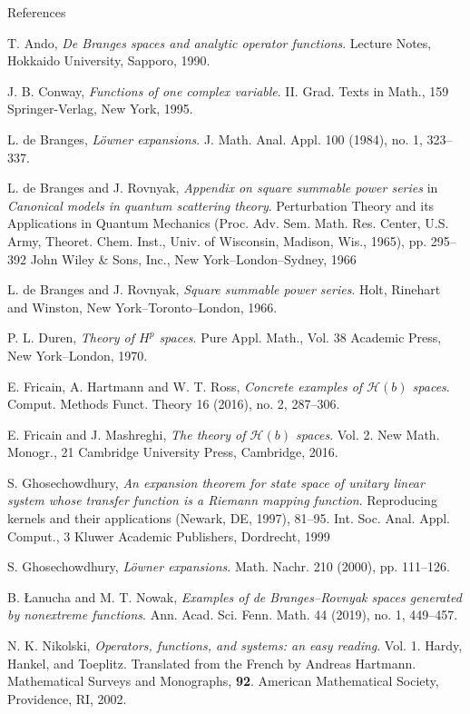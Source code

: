 \documentclass[12pt]{article}
\numberwithin{equation}{section}
\newcommand{\cH}{{\mathcal H}}
\begin{document}
\begin{thebibliography}{References}

T. Ando, 
\textit{De Branges spaces and analytic operator functions}. Lecture Notes, Hokkaido University, Sapporo, 1990. 

J. B. Conway, 
\textit{Functions of one complex variable}. II.
Grad. Texts in Math., 159
Springer-Verlag, New York, 1995. 

L. de Branges, 
\textit{L\"{o}wner expansions}.
J. Math. Anal. Appl. 100 (1984), no. 1, 323--337.

L. de Branges and J. Rovnyak, 
\textit{Appendix on square summable power series} in  
\textit{Canonical models in quantum scattering theory}. 
Perturbation Theory and its Applications in Quantum Mechanics (Proc. Adv. Sem. Math. Res. Center, U.S. Army, Theoret. Chem. Inst., Univ. of Wisconsin, Madison, Wis., 1965), pp. 295--392
John Wiley \& Sons, Inc., New York--London--Sydney, 1966

L. de Branges and J. Rovnyak, 
\textit{Square summable power series}.
Holt, Rinehart and Winston, New York--Toronto--London, 1966.

P. L. Duren, 
\textit{Theory of $H^p$ spaces}.
Pure Appl. Math., Vol. 38
Academic Press, New York--London, 1970. 

E. Fricain, A. Hartmann and W. T. Ross, 
\textit{Concrete examples of $\cH(b)$ spaces}.
Comput. Methods Funct. Theory 16 (2016), no. 2, 287--306.

E. Fricain and J. Mashreghi, 
\textit{The theory of $\cH(b)$ spaces}. Vol. 2.
New Math. Monogr., 21
Cambridge University Press, Cambridge, 2016. 

S. Ghosechowdhury, 
\textit{An expansion theorem for state space of unitary linear system whose transfer function is a Riemann mapping function}.
Reproducing kernels and their applications (Newark, DE, 1997), 81--95.
Int. Soc. Anal. Appl. Comput., 3 
Kluwer Academic Publishers, Dordrecht, 1999

S. Ghosechowdhury, 
\textit{L\"{o}wner expansions}. 
Math. Nachr. 210 (2000), pp. 111--126.

B. {\L}anucha and M. T. Nowak,
\textit{Examples of de Branges--Rovnyak spaces generated by nonextreme functions}.
Ann. Acad. Sci. Fenn. Math. 44 (2019), no. 1, 449--457.

N. K. Nikolski,
\textit{Operators, functions, and systems: an easy reading}. Vol. 1. 
Hardy, Hankel, and Toeplitz. Translated from the French by Andreas Hartmann. Mathematical Surveys and Monographs, 
\textbf{92}. American Mathematical Society, Providence, RI, 2002. 


\end{thebibliography}
\end{document}
